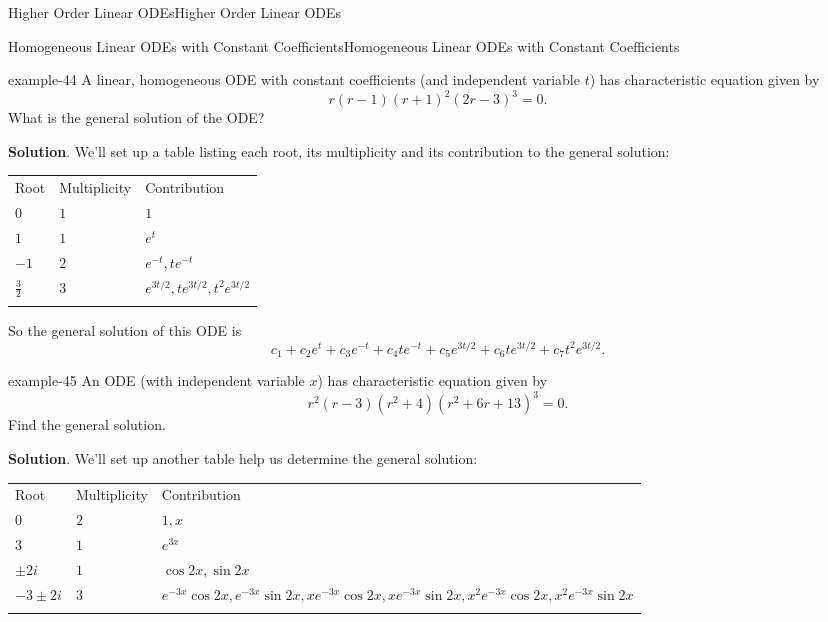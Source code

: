 \documentclass[10pt,]{book}
\numberwithin{equation}{section}
\newcommand{\hrulethick} {\noalign{\hrule height 0.11em}}
\begin{document}
\begin{chapterptx}{Higher Order Linear ODEs}{}{Higher Order Linear ODEs}{}{}
\begin{sectionptx}{Homogeneous Linear ODEs with Constant Coefficients}{}{Homogeneous Linear ODEs with Constant Coefficients}{}{}
\begin{example}{}{example-44}%
\hypertarget{p-277}{}%
A linear, homogeneous ODE with constant coefficients (and independent variable \(t\)) has characteristic equation given by%
\begin{equation*}
r(r-1)(r+1)^{2}(2r-3)^{3} = 0.
\end{equation*}
What is the general solution of the ODE?%
\par\smallskip%
\noindent\textbf{Solution}.\hypertarget{solution-41}{}\quad%
\hypertarget{p-278}{}%
We'll set up a table listing each root, its multiplicity and its contribution to the general solution:%
\begin{table}
\centering
\begin{tabular}{lll}\hrulethick
Root&Multiplicity&Contribution\tabularnewline\hrulethick
\(0\)&\(1\)&\(1\)\tabularnewline\hrulethick
\(1\)&\(1\)&\(e^{t}\)\tabularnewline\hrulethick
\(-1\)&\(2\)&\(e^{-t},te^{-t}\)\tabularnewline\hrulethick
\(\frac{3}{2}\)&\(3\)&\(e^{3t/2},te^{3t/2},t^{2}e^{3t/2}\)\tabularnewline\hrulethick
\end{tabular}
\end{table}
 So the general solution of this ODE is%
\begin{equation*}
c_{1}+c_{2}e^{t}+c_{3}e^{-t}+c_{4}te^{-t}+c_{5}e^{3t/2}+c_{6}te^{3t/2}+c_{7}t^{2}e^{3t/2}.
\end{equation*}
\end{example}
\begin{example}{}{example-45}%
\hypertarget{p-279}{}%
An ODE (with independent variable \(x\)) has characteristic equation given by%
\begin{equation*}
r^{2}(r-3)(r^{2}+4)(r^{2}+6r+13)^{3}=0.
\end{equation*}
Find the general solution.%
\par\smallskip%
\noindent\textbf{Solution}.\hypertarget{solution-42}{}\quad%
\hypertarget{p-280}{}%
We'll set up another table help us determine the general solution:%
\begin{table}
\centering
\begin{tabular}{lll}\hrulethick
Root&Multiplicity&Contribution\tabularnewline\hrulethick
\(0\)&\(2\)&\(1,x\)\tabularnewline\hrulethick
\(3\)&\(1\)&\(e^{3x}\)\tabularnewline\hrulethick
\(\pm2i\)&\(1\)&\(\cos2x,\sin2x\)\tabularnewline\hrulethick
\(-3\pm2i\)&\(3\)&\(e^{-3x}\cos2x,e^{-3x}\sin2x,xe^{-3x}\cos2x,xe^{-3x}\sin2x,x^{2}e^{-3x}\cos2x,x^{2}e^{-3x}\sin2x\)\tabularnewline\hrulethick
\end{tabular}
\end{table}

\end{example}
\end{sectionptx}
\end{chapterptx}
\end{document}
